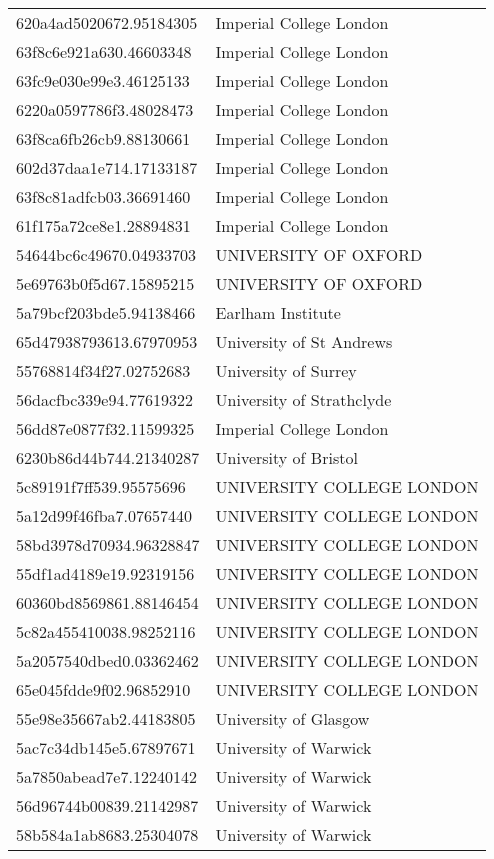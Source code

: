 \begin{tabular}{ll}
620a4ad5020672.95184305 & Imperial College London \\
63f8c6e921a630.46603348 & Imperial College London \\
63fc9e030e99e3.46125133 & Imperial College London \\
6220a0597786f3.48028473 & Imperial College London \\
63f8ca6fb26cb9.88130661 & Imperial College London \\
602d37daa1e714.17133187 & Imperial College London \\
63f8c81adfcb03.36691460 & Imperial College London \\
61f175a72ce8e1.28894831 & Imperial College London \\
54644bc6c49670.04933703 & UNIVERSITY OF OXFORD \\
5e69763b0f5d67.15895215 & UNIVERSITY OF OXFORD \\
5a79bcf203bde5.94138466 & Earlham Institute \\
65d47938793613.67970953 & University of St Andrews \\
55768814f34f27.02752683 & University of Surrey \\
56dacfbc339e94.77619322 & University of Strathclyde \\
56dd87e0877f32.11599325 & Imperial College London \\
6230b86d44b744.21340287 & University of Bristol \\
5c89191f7ff539.95575696 & UNIVERSITY COLLEGE LONDON \\
5a12d99f46fba7.07657440 & UNIVERSITY COLLEGE LONDON \\
58bd3978d70934.96328847 & UNIVERSITY COLLEGE LONDON \\
55df1ad4189e19.92319156 & UNIVERSITY COLLEGE LONDON \\
60360bd8569861.88146454 & UNIVERSITY COLLEGE LONDON \\
5c82a455410038.98252116 & UNIVERSITY COLLEGE LONDON \\
5a2057540dbed0.03362462 & UNIVERSITY COLLEGE LONDON \\
65e045fdde9f02.96852910 & UNIVERSITY COLLEGE LONDON \\
55e98e35667ab2.44183805 & University of Glasgow \\
5ac7c34db145e5.67897671 & University of Warwick \\
5a7850abead7e7.12240142 & University of Warwick \\
56d96744b00839.21142987 & University of Warwick \\
58b584a1ab8683.25304078 & University of Warwick \\

\end{tabular}
